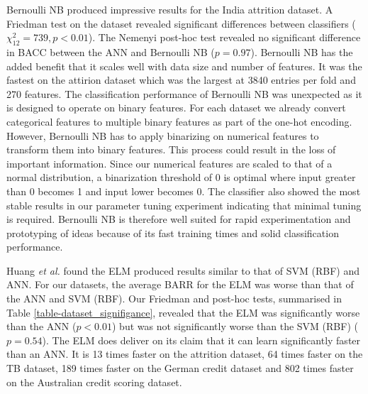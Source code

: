 \documentclass{sig-alternate-05-2015}
\begin{document}
	Bernoulli NB produced impressive results for the India attrition dataset. A Friedman test on the dataset revealed significant differences between classifiers ($\chi^2_{12}=739, p<0.01$). The Nemenyi post-hoc test revealed no significant difference in BACC between the ANN and Bernoulli NB ($p=0.97$). Bernoulli NB has the added benefit that it scales well with data size and number of features. It was the fastest on the attirion dataset which was the largest at 3840 entries per fold and 270 features. The classification performance of Bernoulli NB was unexpected as it is designed to operate on binary features. For each dataset we already convert categorical features to multiple binary features as part of the one-hot encoding. However, Bernoulli NB has to apply binarizing on numerical features to transform them into binary features. This process could result in the loss of important information. Since our numerical features are scaled to that of a normal distribution, a binarization threshold of 0 is optimal where input greater than 0 becomes 1 and input lower becomes 0. The classifier also showed the most stable results in our parameter tuning experiment indicating that minimal tuning is required. Bernoulli NB is therefore well suited for rapid experimentation and prototyping of ideas because of its fast training times and solid classification performance.

	Huang \textit{et al.} \cite{6035797, Huang2006489} found the ELM produced results similar to that of SVM (RBF) and ANN. For our datasets, the average BARR for the ELM was worse than that of the ANN and SVM (RBF). Our Friedman and post-hoc tests, summarised in Table \ref{table-dataset_signifigance}, revealed that the ELM was significantly worse than the ANN ($p<0.01$) but was not significantly worse than the SVM (RBF) ($p=0.54$). The ELM does deliver on its claim that it can learn significantly faster than an ANN. It is 13 times faster on the attrition dataset, 64 times faster on the TB dataset, 189 times faster on the German credit dataset and 802 times faster on the Australian credit scoring dataset.
	
\end{document}
